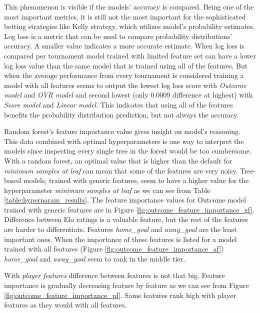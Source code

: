 This phenomenon is visible if the models' accuracy is compared. Being one of the most important metrics, it is still not the most important for the sophisticated betting strategies like Kelly strategy, which utilizes model's probability estimates. Log loss is a metric that can be used to compare probability distributions' accuracy. A smaller value indicates a more accurate estimate. When log loss is compared per tournament model trained with limited feature set can have a lower log loss value than the same model that is trained using all of the features. But when the average performance from every tournament is considered training a model with all features seems to output the lowest log loss score with \textit{Outcome model} and \textit{OVR model} and second lowest (only 0.0009 difference at highest) with \textit{Score model} and \textit{Linear model}. This indicates that using all of the features benefits the probability distribution prediction, but not always the accuracy.

Random forest's feature importance value gives insight on model's reasoning. This data combined with optimal hyperparameters is one way to interpret the models since inspecting every single tree in the forest would be too cumbersome. With a random forest, an optimal value that is higher than the default for \textit{minimum samples at leaf} can mean that some of the features are very noisy. Tree-based models, trained with generic features, seem to have a higher value for the hyperparameter \textit{minimum samples at leaf} as we can see from Table \ref{table:hyperparam_results}. The feature importance values for Outcome model trained with generic features are in Figure \ref{fig:outcome_feature_importance_gf}. Difference between Elo ratings is a valuable feature, but the rest of the features are harder to differentiate. Features \textit{home\_goal} and \textit{away\_goal} are the least important ones. When the importance of these features is listed for a model trained with all features (Figure \ref{fig:outcome_feature_importance_af}) \textit{home\_goal} and \textit{away\_goal} seem to rank in the middle tier.

With \textit{player features} difference between features is not that big. Feature importance is gradually decreasing feature by feature as we can see from Figure \ref{fig:outcome_feature_importance_pf}. Same features rank high with player features as they would with all features.

